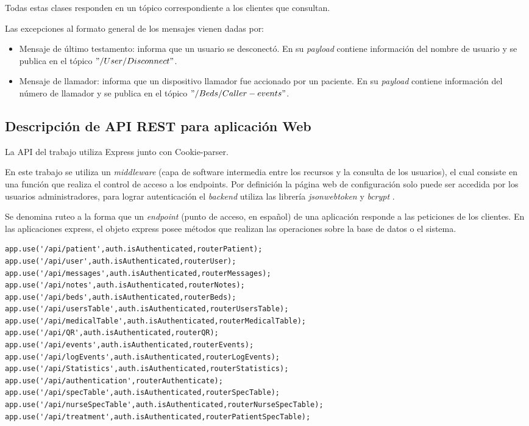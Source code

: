 Todas estas clases responden en un tópico correspondiente a los clientes que consultan.


Las excepciones al formato general de los mensajes vienen dadas por:
\begin{itemize}
\item Mensaje de último testamento: informa que un usuario se desconectó. En su \textit{payload} contiene información del nombre de usuario y se publica en el tópico $"/User/Disconnect"$.
\item Mensaje de llamador: informa que un dispositivo llamador fue accionado por un paciente. En su \textit{payload} contiene información del número de llamador y se publica en el tópico $"/Beds/Caller-events"$.

\end{itemize}


\pagebreak

\subsection{Descripción de API REST para aplicación Web}

La API del trabajo utiliza Express junto con Cookie-parser. 
 
En este trabajo se utiliza un \textit{middleware} (capa de software intermedia entre los recursos y la consulta de los usuarios), el cual consiste en una función que realiza el control de acceso a los endpoints. Por definición la página web de configuración solo puede ser accedida por los usuarios administradores, para lograr autenticación el \textit{backend} utiliza las librería \textit{jsonwebtoken} \citep{WEBSITE:32} y \textit{bcrypt} \citep{WEBSITE:31}. 

Se denomina ruteo a la forma que un \textit{endpoint} (punto de acceso, en español) de una aplicación responde a las peticiones de los clientes. En las aplicaciones express, el objeto express posee métodos que realizan las operaciones sobre la base de datos o el sistema.

\begin{lstlisting}[caption=  Rutas express]
app.use('/api/patient',auth.isAuthenticated,routerPatient);
app.use('/api/user',auth.isAuthenticated,routerUser);
app.use('/api/messages',auth.isAuthenticated,routerMessages);
app.use('/api/notes',auth.isAuthenticated,routerNotes);
app.use('/api/beds',auth.isAuthenticated,routerBeds);
app.use('/api/usersTable',auth.isAuthenticated,routerUsersTable);
app.use('/api/medicalTable',auth.isAuthenticated,routerMedicalTable);
app.use('/api/QR',auth.isAuthenticated,routerQR);
app.use('/api/events',auth.isAuthenticated,routerEvents);
app.use('/api/logEvents',auth.isAuthenticated,routerLogEvents);
app.use('/api/Statistics',auth.isAuthenticated,routerStatistics);
app.use('/api/authentication',routerAuthenticate);
app.use('/api/specTable',auth.isAuthenticated,routerSpecTable);
app.use('/api/nurseSpecTable',auth.isAuthenticated,routerNurseSpecTable);
app.use('/api/treatment',auth.isAuthenticated,routerPatientSpecTable);
\end{lstlisting}



